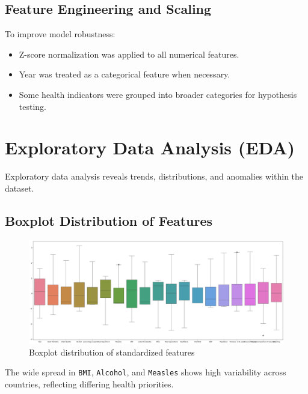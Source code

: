 \documentclass[11pt]{article}
\begin{document}
\subsection{Feature Engineering and Scaling}
To improve model robustness:
\begin{itemize}
    \item Z-score normalization was applied to all numerical features.
    \item Year was treated as a categorical feature when necessary.
    \item Some health indicators were grouped into broader categories for hypothesis testing.
\end{itemize}

\section{Exploratory Data Analysis (EDA)}
Exploratory data analysis reveals trends, distributions, and anomalies within the dataset.

\subsection{Boxplot Distribution of Features}
\begin{figure}[H]
    \centering
    \includegraphics[width=\textwidth]{output.png}
    \caption{Boxplot distribution of standardized features}
\end{figure}
The wide spread in \texttt{BMI}, \texttt{Alcohol}, and \texttt{Measles} shows high variability across countries, reflecting differing health priorities.
\end{document}
